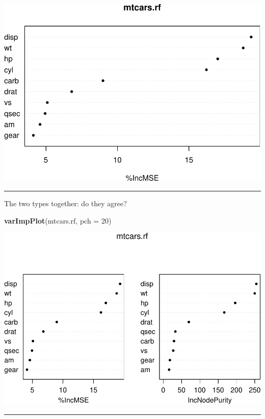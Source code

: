 \documentclass[]{article}
\newenvironment{Shaded}{\begin{snugshade}}{\end{snugshade}}
\newcommand{\DataTypeTok}[1]{\textcolor[rgb]{0.13,0.29,0.53}{#1}}
\newcommand{\DecValTok}[1]{\textcolor[rgb]{0.00,0.00,0.81}{#1}}
\newcommand{\KeywordTok}[1]{\textcolor[rgb]{0.13,0.29,0.53}{\textbf{#1}}}
\newcommand{\NormalTok}[1]{#1}
\begin{document}
\includegraphics{8Trees_files/figure-latex/unnamed-chunk-30-1.pdf}

\begin{center}\rule{0.5\linewidth}{\linethickness}\end{center}

The two types together: do they agree?

\begin{Shaded}
\begin{Highlighting}[]
\KeywordTok{varImpPlot}\NormalTok{(mtcars.rf, }\DataTypeTok{pch =} \DecValTok{20}\NormalTok{)}
\end{Highlighting}
\end{Shaded}

\includegraphics{8Trees_files/figure-latex/unnamed-chunk-31-1.pdf}

\begin{center}\rule{0.5\linewidth}{\linethickness}\end{center}
\end{document}
